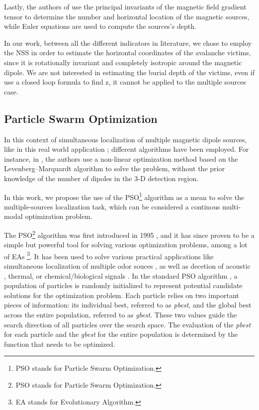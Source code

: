 Lastly, the authors of \cite{multiple_spacecraft} use 
the principal invariants of the magnetic field gradient tensor
to determine the number and horizontal location of the magnetic sources, 
while Euler equations are used to compute the sources's depth.

In our work, between all the different indicators in literature,
we chose to employ the NSS in order to estimate the 
horizontal coordinates of the avalanche victims, 
since it is rotationally invariant and completely isotropic 
around the magnetic dipole.
We are not interested in estimating the burial depth of the victims,
even if \cite{not_import_formula_z} use a closed loop formula to find z,
it cannot be applied to the multiple sources case.


\subsection{Particle Swarm Optimization}
In this context of simultaneous localization of multiple magnetic 
dipole sources, like in this real world application \cite{real_application}; 
different algorithms have been employed.
For instance, in \cite{DetectionMultiplMagnetiDipoleSources}, the authors
use a non-linear optimization method based on the Levenberg–Marquardt algorithm
to solve the problem, without the prior knowledge of the number of 
dipoles in the 3-D detection region.

In this work, we propose the use of the PSO\footnote{PSO stands for Particle Swarm Optimization.} 
algorithm as a mean to solve the multiple-sources localization task, 
which can be considered a continous multi-modal optimization problem.

The PSO\footnote{PSO stands for Particle Swarm Optimization.} algorithm 
was first introduced in 1995 \cite{PSO_original}, and it has since proven to be 
a simple but powerful tool for solving various optimization problems\cite{PSO_IMPORTANT},
among a lot of EAs \footnote{EA stands for Evolutionary Algorithm.}.
It has been used to solve various practical applications like simultaneous
localization of multiple odor souces \cite{12}, as well as decetion of acoustic 
\cite{PSO_acustic}, thermal, or chemical/biological signals \cite{3}.
In the standard PSO algorithm \cite{PSO_original}, a population of particles is 
randomly initialized to represent potential candidate solutions for the optimization problem. 
Each particle relies on two important pieces of information: its individual 
best, referred to as \textit{pbest}, and the global best across the entire population, 
referred to as \textit{gbest}. These two values guide the search direction of all particles over the search space. 
The evaluation of the \textit{pbest} for each particle and the \textit{gbest} for 
the entire population is determined by the function that needs to be optimized.

